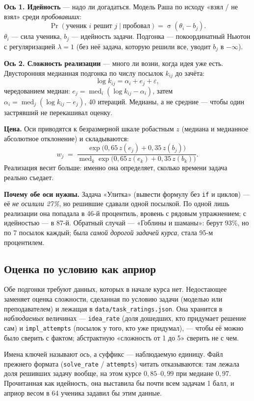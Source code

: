 \documentclass[11pt,a4paper]{article}
\newcommand{\med}{\operatorname{med}}
\newcommand{\sig}{\operatorname{\sigma}}
\begin{document}
\textbf{Ось 1. Идейность} --- надо ли догадаться. Модель Раша по исходу
«взял / не взял» среди \emph{пробовавших}:
\[
  \Pr(\text{ученик } i \text{ решит } j \mid \text{пробовал}) = \sig(\theta_i - b_j).
\]
$\theta_i$ --- сила ученика, $b_j$ --- идейность задачи. Подгонка --- покоординатный
Ньютон с регуляризацией $\lambda = 1$ (без неё задача, которую решили все,
уводит $b_j$ в $-\infty$).

\textbf{Ось 2. Сложность реализации} --- много ли возни, когда идея уже есть.
Двусторонняя медианная подгонка по числу посылок
$k_{ij}$ до зачёта:
\[
  \log k_{ij} = \alpha_i + e_j + \varepsilon,
\]
чередованием медиан: $e_j = \med_i(\log k_{ij} - \alpha_i)$, затем
$\alpha_i = \med_j(\log k_{ij} - e_j)$, 40 итераций. Медианы, а не средние ---
чтобы один застрявший не перекашивал оценку.

\textbf{Цена.} Оси приводятся к безразмерной шкале робастным $z$ (медиана и
медианное абсолютное отклонение) и складываются:
\[
  w_j \;=\; \frac{\exp\bigl(0{,}65\,z(e_j) + 0{,}35\,z(b_j)\bigr)}
                 {\med_k \exp\bigl(0{,}65\,z(e_k) + 0{,}35\,z(b_k)\bigr)}.
\]
Реализация весит больше: именно она определяет, сколько времени задача реально
съедает.

\textbf{Почему обе оси нужны.} Задача «Улитка» (вывести формулу без \texttt{if}
и циклов) --- её \emph{не осилили 27\%}, но решившие сдавали одной посылкой. По
одной лишь реализации она попадала в 46-й процентиль, вровень с рядовым
упражнением; с идейностью --- в 87-й. Обратный случай --- «Гоблины и шаманы»:
берут 93\%, но по 7 посылок каждый; была \emph{самой дорогой задачей курса},
стала 95-м процентилем.

\subsection*{Оценка по условию как априор}

Обе подгонки требуют данных, которых в начале курса нет. Недостающее заменяет
оценка сложности, сделанная по условию задачи (моделью или преподавателем) и
лежащая в \texttt{data/task\_ratings.json}. Она хранится в \emph{наблюдаемых}
величинах --- \texttt{idea\_rate} (доля дошедших, кто придумает решение сам) и
\texttt{impl\_attempts} (посылок у того, кто уже придумал), --- чтобы её можно
было сверить с фактом; абстрактную «сложность от 1 до 5» сверить не с чем.

Имена ключей называют \emph{ось}, а суффикс --- наблюдаемую единицу. Файл
прежнего формата (\texttt{solve\_rate} / \texttt{attempts}) читать отказываются:
там лежала доля решивших задачу вообще, на этом курсе $0{,}85$--$0{,}99$ при
медиане $0{,}97$. Прочитанная как идейность, она выставила бы почти всем задачам
1 балл, и априор весом в 64 ученика задавил бы этим данные.
\end{document}
